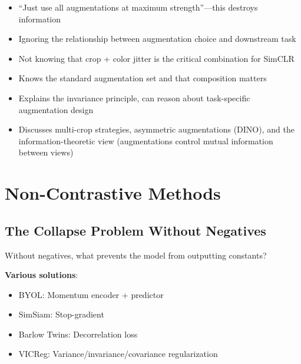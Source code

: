 \begin{interviewq}
\redflags
\begin{itemize}
    \item ``Just use all augmentations at maximum strength''---this destroys information
    \item Ignoring the relationship between augmentation choice and downstream task
    \item Not knowing that crop + color jitter is the critical combination for SimCLR
\end{itemize}


\goodgreat
\begin{itemize}
    \item {} Knows the standard augmentation set and that composition matters
    \item {} Explains the invariance principle, can reason about task-specific augmentation design
    \item {} Discusses multi-crop strategies, asymmetric augmentations (DINO), and the information-theoretic view (augmentations control mutual information between views)
\end{itemize}

\end{interviewq}

\section{Non-Contrastive Methods}
\label{sec:non_contrastive}

\subsection{The Collapse Problem Without Negatives}

Without negatives, what prevents the model from outputting constants?

\textbf{Various solutions}:
\begin{itemize}
    \item BYOL: Momentum encoder + predictor
    \item SimSiam: Stop-gradient
    \item Barlow Twins: Decorrelation loss
    \item VICReg: Variance/invariance/covariance regularization
\end{itemize}


